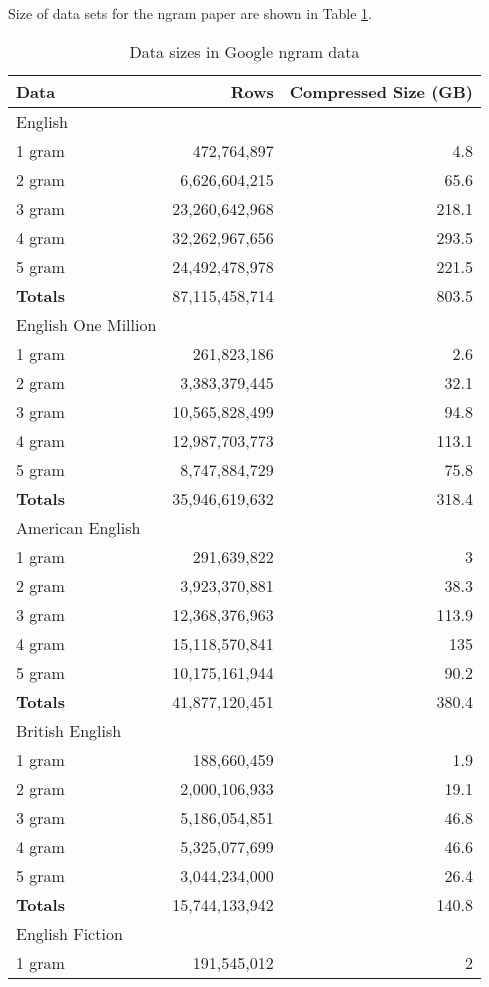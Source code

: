 \documentclass[a4paper]{tufte-handout}
\begin{document}
Size of data sets for the ngram paper are shown in Table \ref{tab:ngram-sizes}.

\begin{table}[p]
\label{tab:ngram-sizes}
\centering
\caption{Data sizes in Google ngram data} 
\begin{tabular}{lrr} 
\toprule
Data 	&	Rows &	Compressed Size (GB)\\
\midrule
English\\
\midrule
1 gram &	472,764,897 &	4.8\\
2 gram &	6,626,604,215 &	65.6\\
3 gram &	23,260,642,968 &	218.1\\
4 gram &	32,262,967,656 &	293.5\\
5 gram &	24,492,478,978 &	221.5\\
\textbf{Totals} &	87,115,458,714 &	803.5\\
\midrule
English One Million\\
\midrule
1 gram &	261,823,186 &	2.6\\
2 gram &	3,383,379,445 &	32.1\\
3 gram &	10,565,828,499 &	94.8\\
4 gram &	12,987,703,773 &	113.1\\
5 gram &	8,747,884,729 &	75.8\\
\textbf{Totals} &	35,946,619,632 &	318.4\\
\midrule
American English\\
\midrule
1 gram &	291,639,822 &	3\\
2 gram &	3,923,370,881 &	38.3\\
3 gram &	12,368,376,963 &	113.9\\
4 gram &	15,118,570,841 &	135\\
5 gram &	10,175,161,944 &	90.2\\
\textbf{Totals} &	41,877,120,451 &	380.4\\
\midrule
British English\\
\midrule
1 gram &	188,660,459 &	1.9\\
2 gram &	2,000,106,933 &	19.1\\
3 gram &	5,186,054,851 &	46.8\\
4 gram &	5,325,077,699 &	46.6\\
5 gram &	3,044,234,000 &	26.4\\
\textbf{Totals} &	15,744,133,942 &	140.8\\
\midrule
English Fiction\\
\midrule
1 gram	&	191,545,012	&	2\\

\end{tabular}
\end{table}
\end{document}
